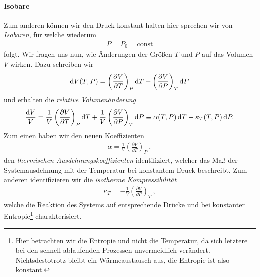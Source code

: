 \paragraph*{Isobare}
Zum anderen können wir den Druck konstant halten \textendash{} hier sprechen wir von \emph{Isobaren}, für welche wiederum
\begin{align*}
    P=P_0=\mathrm{const}%
\end{align*}
folgt.
Wir fragen uns nun, wie Änderungen der Größen $T$ und $P$ auf das Volumen $V$ wirken. Dazu schreiben wir
\begin{align*}
    \mathop{}\!\mathrm{d} V (T,P)= \left( \frac{\partial V}{\partial T}\right)_P \mathop{}\!\mathrm{d} T+\left( \frac{\partial V}{\partial P}\right)_T \mathop{}\!\mathrm{d} P
\end{align*}
und erhalten die \emph{relative Volumenänderung}
\begin{align*}
    \frac{\mathop{}\!\mathrm{d} V}{V}=\frac{1}{V}\left( \frac{\partial V}{\partial T}\right)_P\mathop{}\!\mathrm{d} T+\frac{1}{V}\left( \frac{\partial V}{\partial P}\right)_T\mathop{}\!\mathrm{d} P \equiv \alpha(T,P)\mathop{}\!\mathrm{d} T-\kappa_T(T,P)\mathop{}\!\mathrm{d} P.
\end{align*}
Zum einen haben wir den neuen Koeffizienten
\begin{align*}
    \boxed{\alpha=\frac{1}{V}\left( \frac{\partial V}{\partial T}\right)_P}\:,
\end{align*}
den \emph{thermischen Ausdehnungskoeffizienten} identifiziert, welcher das Maß der Systemausdehnung mit der Temperatur bei konstantem Druck beschreibt. Zum anderen identifizieren wir die \emph{isotherme Kompressibilität}
\begin{align*}
    \boxed{\kappa_T=-\frac{1}{V}\left( \frac{\partial V}{\partial P}\right)_T}\:,
\end{align*}
welche die Reaktion des Systems auf entsprechende Drücke und bei konstanter Entropie\footnote{Hier betrachten wir die Entropie und nicht die Temperatur, da sich letztere bei den schnell ablaufenden Prozessen unvermeidlich verändert. Nichtsdestotrotz bleibt ein Wärmeaustausch aus, die Entropie ist also konstant.} charakterisiert.


